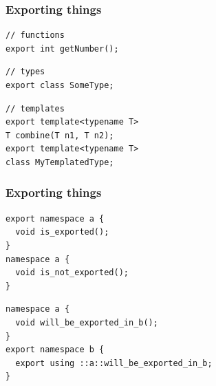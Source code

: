 \documentclass[aspectratio=169]{beamer}
\newif\iftransitions
\newcommand{\cpause}{\iftransitions \pause \fi}
\begin{document}
\begin{frame}[fragile]
  \frametitle{Exporting things}

  \begin{lstlisting}[style=cpp20]
// functions
export int getNumber();
  \end{lstlisting}
  \cpause
  \begin{lstlisting}[style=cpp20]
// types
export class SomeType;
  \end{lstlisting}
  \cpause
  \begin{lstlisting}[style=cpp20]
// templates
export template<typename T>
T combine(T n1, T n2);
export template<typename T>
class MyTemplatedType;
  \end{lstlisting}

\end{frame}

\begin{frame}[fragile]
  \frametitle{Exporting things}

  \begin{lstlisting}[style=cpp20]
export namespace a {
  void is_exported();
}
namespace a {
  void is_not_exported();
}
  \end{lstlisting}
  \cpause
  \begin{lstlisting}[style=cpp20]
namespace a {
  void will_be_exported_in_b();
}
export namespace b {
  export using ::a::will_be_exported_in_b;
}
  \end{lstlisting}

\end{frame}
\end{document}
